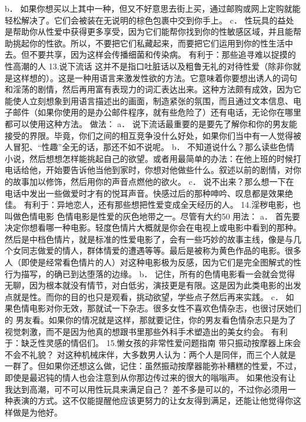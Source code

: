 \documentclass[12pt,UTF8,openany]{ctexbook}
\begin{document}
b． 如果你想买以上其中一种，但又不好意思去街上买，通过邮购或网上定购就能轻松解决了。它们会被装在无说明的棕色包裹中交到你手上。
c． 性玩具的益处是帮助你从性爱中获得更多享受，因为它们能帮你找到你的性敏感区域，并且能帮助挑起你的性欲。所以，不要把它们私藏起来，而要把它们运用到你的性生活中去。但不要共享，因为这样会传播细菌和传染病。
有利于：那些追寻难以捉摸的性高潮的人
13.说下流话
这并不是指口吐脏话以及粗鲁无礼的对待性爱（除非你就是这样想的）。这是一种用语言来激发性欲的方法。它意味着你要想出诱人的词句和淫荡的剧情，然后再用富有表现力的词汇表达出来。这种方法颇有成效，因为它能使人立刻想象到用语言描述出的画面，制造紧张的氛围，而且通过文本信息、电子邮件（如果你使用的是办公邮件程序，就有些危险了）还有电话，无论你在哪里都可以使用这种方法。
做法：
a． 说下流话最重要的是要先了解你和你的男友能接受的界限。毕竟，你们之间的相互竞争没什么好处，如果你们当中有一人觉得被人冒犯、“性趣”全无的话，那还不如不说呢。
b． 不知道说什么？那么读些色情小说，然后想想怎样能挑起自己的欲望。或者用最简单的办法：在他上班的时候打电话给他，开始要告诉他当他到家时，你想对他做些什么。叙述以前的剧情，对你的故事加以修饰，然后用你的声音点燃他的欲火。
c． 说不出来？那么想一下在电话中发出一些做爱时才有的悦耳声音。快感过后的那种呻吟、叹息都是效果绝佳。
有利于：异地恋人，还有那些想把性爱变成全天经历的人。
14.淫秽电影，也叫做色情电影
色情电影是性爱的灰色地带之一。尽管有大约50%
用法：
a． 首先要决定你想看哪一种电影。轻度色情片大概就是你会在电视上或电影中看到的那种。然后是中档色情片，就是标准的性爱电影了，会有一些巧妙的故事主线，像是与几个女同志做爱的情人，群体情爱的遭遇等等。最后是被称为黄色作品的电影。很多人（即使是经常看色情片的人）对这种电影极为反感，因为它们是完全图解式的性行为描写，的确已到达堕落的边缘。
b． 记住，所有的色情电影看一会就会觉得无聊，因为根本就没有情节，对白低劣，演技更是有限。这是因为此类电影的出发点就是性。而你的目的也只是观看，挑动欲望，学些点子然后再来实践。
c． 如果色情电影对你无效，那就试一下杂志。很多女性不喜欢色情杂志，也很讨厌她们的
男友看。如果你的情况就是这样，那就要记住，你的男友看色情杂志只是为了视觉刺激，而不是因为他真的想跟书里那些外科手术塑造出的美女约会。
有利于：缺乏性灵感的情侣们。
15.懒女孩的非常性爱问题指南
带只振动按摩器上床会不会不礼貌？
对这种机械床伴，大多数男人认为：两个人是同伴，而三个人就是一群了。但如果你还想这么做，记住：虽然振动按摩器能弥补糟糕的性爱，不过，即使是最迟钝的情人也会注意到从你那边传过来的很大的嗡嗡声。
如果他没有让我达到高潮，可不可以用性玩具来满足自己？
差不多是可以的，不过你必须用一种表演的方式。这不仅能提醒他应该更努力的让女友得到满足，还能让他觉得你这样做是为他好。
\end{document}
